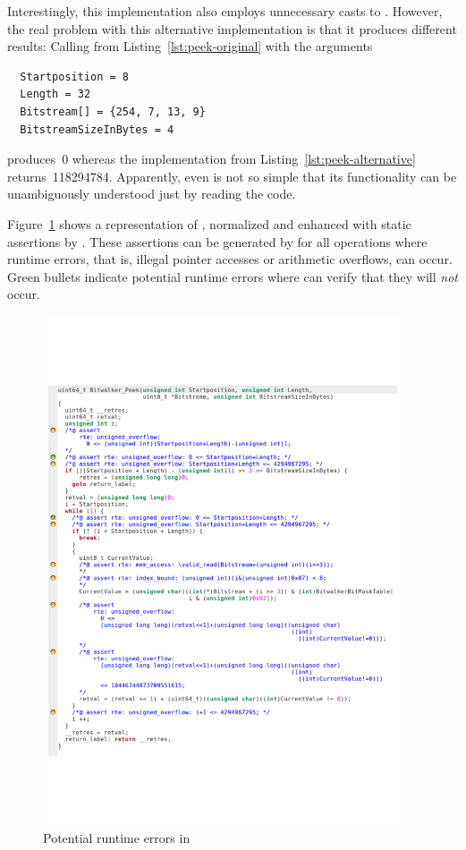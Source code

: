 Interestingly, this implementation also employs unnecessary casts to .
However, the real problem with this alternative implementation is that it produces
different results: Calling \peek from Listing~\ref{lst:peek-original} with the arguments

\begin{verbatim}
  Startposition = 8
  Length = 32
  Bitstream[] = {254, 7, 13, 9}
  BitstreamSizeInBytes = 4
\end{verbatim}

produces~0 whereas the implementation from Listing~\ref{lst:peek-alternative} returns~118294784.
Apparently, even \peek is not so simple that its functionality can be unambiguously
understood just by reading the code.


\clearpage

Figure~\ref{fig:peek-wp} shows a representation of \peek, normalized 
and enhanced with static \acsl assertions by \framacwp.
These assertions can be generated by \framac for all operations where
runtime errors, that is, illegal pointer accesses or arithmetic overflows, can occur.
Green bullets indicate potential runtime errors where \framacwp can verify
that they will \emph{not} occur.


\begin{figure}[hbt]
\begin{center}
\includegraphics[width=0.95\textwidth]{figures/peek-wp.pdf}
\caption{\label{fig:peek-wp} Potential runtime errors in \peek}
\end{center}
\end{figure}

